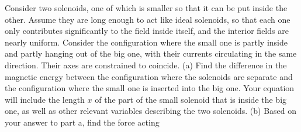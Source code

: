         Consider two solenoids, one of which is smaller so that
        it can be put inside the other. Assume they are long enough
        to act like ideal solenoids, so that each one only
        contributes significantly to the field inside itself, and
        the interior fields are nearly uniform. Consider the
        configuration where the small one is partly inside and
        partly hanging out of the big one, with their currents
        circulating in the same direction. Their axes are constrained to coincide.\hwendpart
        (a) Find the difference in the magnetic  energy between the configuration where the
        solenoids are separate and the configuration where the small one is inserted into the
        big one. Your equation will include the
        length $x$ of the part of the small solenoid that is inside
        the big one, as well as other relevant
        variables describing the two solenoids.\answercheck\hwendpart
        (b) Based on your answer to part a, find the force acting
